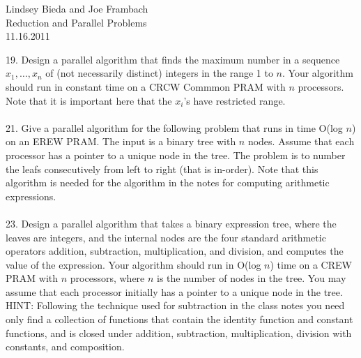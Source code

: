 \documentclass[10pt]{article}
\begin{document}
	\begin{flushright}
	Lindsey Bieda and Joe Frambach\\
	Reduction and Parallel Problems\\
	11.16.2011
	\end{flushright}

19. Design a parallel algorithm that finds the maximum number in a sequence $x_1, \ldots, x_n$ of (not necessarily
distinct) integers in the range 1 to $n$. Your algorithm should run in constant time on a CRCW
Commmon PRAM with $n$ processors. Note that it is important here that the $x_i$'s have restricted
range.
\\
\\
21. Give a parallel algorithm for the following problem that runs in time O(log $n$) on an EREW PRAM.
The input is a binary tree with $n$ nodes. Assume that each processor has a pointer to a unique node in
the tree. The problem is to number the leafs consecutively from left to right (that is in-order). Note
that this algorithm is needed for the algorithm in the notes for computing arithmetic expressions.
\\
\\
23. Design a parallel algorithm that takes a binary expression tree, where the leaves are integers, and the
internal nodes are the four standard arithmetic operators addition, subtraction, multiplication, and
division, and computes the value of the expression. Your algorithm should run in O(log $n$) time on a
CREW PRAM with $n$ processors, where $n$ is the number of nodes in the tree. You may assume that
each processor initially has a pointer to a unique node in the tree.\\
HINT: Following the technique used for subtraction in the class notes you need only find a collection
of functions that contain the identity function and constant functions, and is closed under addition,
subtraction, multiplication, division with constants, and composition.
\end{document}
